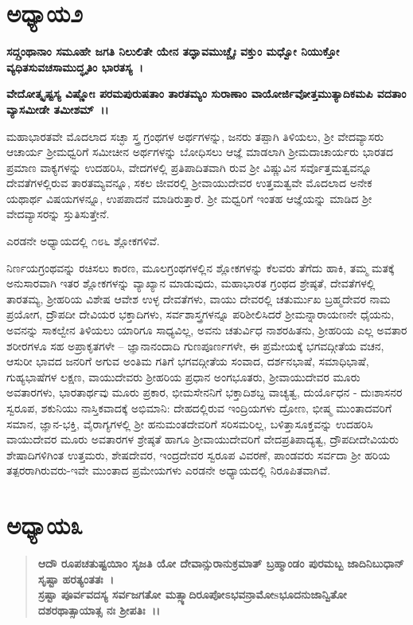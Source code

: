 \section*{ಅಧ್ಯಾಯ\enginline{-}೨}

\textbf{ಸದ್ಗ್ರಂಥಾನಾಂ ಸಮೂಹೇ ಜಗತಿ ನಿಲುಲಿತೇ ಯೇನ ತದ್ಘಾವಮುಚ್ಚೈಃ ವಕ್ತುಂ ಮಧ್ವೋ ನಿಯುಕ್ತೋ ವ್ಯಧಿತಸುವಚಸಾಮುದ್ಧೃತಿಂ ಭಾರತಸ್ಯ~।}

\noindent
\textbf{ವೇದೋತ್ಕೃಷ್ಟಸ್ಯ ವಿಷ್ಣೋಃ ಪರಮಪುರುಷತಾಂ ತಾರತಮ್ಯಂ ಸುರಾಣಾಂ ವಾಯೋರ್ಜಿವೋ\-ತ್ತಮುತ್ಯಾದಿಕಮಪಿ ವದತಾಂ ವ್ಯಾಸಮೀಡೇ ತಮೀಶಮ್~।। }

ಮಹಾಭಾರತವೇ ಮೊದಲಾದ ಸಚ್ಛಾ ಸ್ತ್ರ ಗ್ರಂಥಗಳ ಅರ್ಥಗಳನ್ನು, ಜನರು ತಪ್ಪಾಗಿ ತಿಳಿಯಲು, ಶ‍್ರೀ ವೇದವ್ಯಾಸರು ಆಚಾರ್ಯ ಶ‍್ರೀಮಧ್ವರಿಗೆ ಸಮೀಚೀನ ಅರ್ಥಗಳನ್ನು ಬೋಧಿಸಲು ಆಜ್ಞೆ ಮಾಡಲಾಗಿ ಶ‍್ರೀಮದಾಚಾರ್ಯರು ಭಾರತದ ಪ್ರಮಾಣ ವಾಕ್ಯಗಳನ್ನು ಉದಹರಿಸಿ, ವೇದಗಳಲ್ಲಿ ಪ್ರತಿಪಾದಿತವಾಗಿ ರುವ ಶ‍್ರೀ ವಿಷ್ಣುವಿನ ಸರ್ವೊತ್ತಮತ್ವವನ್ನೂ ದೇವತೆಗಳಲ್ಲಿರುವ ತಾರತಮ್ಯವನ್ನೂ, ಸಕಲ ಜೀವರಲ್ಲಿ ಶ‍್ರೀವಾಯುದೇವರ ಉತ್ತಮತ್ವವೇ ಮೊದಲಾದ ಅನೇಕ ಯಥಾರ್ಥ ವಿಷಯಗಳನ್ನೂ, ಉಪಪಾದನೆ ಮಾಡಿರುತ್ತಾರೆ. ಶ‍್ರೀ ಮಧ್ವರಿಗೆ ಇಂತಹ ಆಜ್ಞೆಯನ್ನು ಮಾಡಿದ ಶ‍್ರೀ ವೇದವ್ಯಾಸರನ್ನು ಸ್ತುತಿಸುತ್ತೇನೆ.

ಎರಡನೇ ಅಧ್ಯಾಯದಲ್ಲಿ ೧೮೬ ಶ್ಲೋಕಗಳಿವೆ.

ನಿರ್ಣಯಗ್ರಂಥವನ್ನು ರಚಿಸಲು ಕಾರಣ, ಮೂಲಗ್ರಂಥಗಳಲ್ಲಿನ ಶ್ಲೋಕಗಳನ್ನು ಕೆಲವರು ತೆಗೆದು ಹಾಕಿ, ತಮ್ಮ ಮತಕ್ಕೆ ಅನುಸಾರವಾಗಿ ಇತರ ಶ್ಲೋಕಗಳನ್ನು ವ್ಯಾಖ್ಯಾನ ಮಾಡುವುದು, ಮಹಾಭಾರತ ಗ್ರಂಥದ ಶ್ರೇಷ್ಠತೆ, ದೇವತೆಗಳಲ್ಲಿ ತಾರತಮ್ಯ, ಶ‍್ರೀಹರಿಯ ವಿಶೇಷ ಆವೇಶ ಉಳ್ಳ ದೇವತೆಗಳು, ವಾಯು ದೇವರಲ್ಲಿ ಚತುರ್ಮುಖ ಬ್ರಹ್ಮದೇವರ ನಾಮ ಪ್ರಯೋಗ, ದ್ರೌಪದೀ ದೇವಿಯರ ಭಕ್ತಾದಿಗಳು, ಸರ್ವಶಾಸ್ತ್ರಗಳನ್ನೂ ಪರಿಶೀಲಿಸಿದರೆ ಶ‍್ರೀಮನ್ನಾರಾಯಣನೇ ಧೈಯನು, ಅವನನ್ನು ಸಾಕಲ್ವೇನ ತಿಳಿಯಲು ಯಾರಿಗೂ ಸಾಧ್ಯವಿಲ್ಲ, ಅವನು ಚತುರ್ವಿಧ ನಾಶರಹಿತನು, ಶ‍್ರೀಹರಿಯ ಎಲ್ಲ ಅವತಾರ ಶರೀರಗಳೂ ಸಹ ಅಪ್ರಾಕೃತಗಳೇ – ಜ್ಞಾನಾನಂದಾದಿ ಗುಣಪೂರ್ಣಗಳೇ, ಈ ಪ್ರಮೇಯಕ್ಕೆ ಭಗವದ್ಗೀತೆಯ ವಚನ, ಆಸುರೀ ಭಾವದ ಜನರಿಗೆ ಅಗುವ ಅಂತಿಮ ಗತಿಗೆ ಭಗವದ್ಗೀತೆಯ ಸಂವಾದ, ದರ್ಶನಭಾಷೆ, ಸಮಾಧಿಭಾಷೆ, ಗುಹ್ಯಭಾಷೆಗಳ ಲಕ್ಷಣ, ವಾಯುದೇವರು ಶ‍್ರೀಹರಿಯ ಪ್ರಧಾನ ಅಂಗಭೂತರು, ಶ‍್ರೀವಾಯುದೇವರ ಮೂರು ಅವತಾರಗಳು, ಭಾರತಾರ್ಥವು ಮೂರು ಪ್ರಕಾರ, ಭೀಮಸೇನನಿಗೆ ಭಕ್ತಾದಿಶಬ್ದ ವಾಚ್ಯತ್ವ, ದುರ್ಯೊಧನ - ದುಃಶಾಸನರ ಸ್ವರೂಪ, ಶಕುನಿಯು ನಾಸ್ತಿಕವಾದಕ್ಕೆ ಅಭಿಮಾನಿ: ದೇಹದಲ್ಲಿರುವ ಇಂದ್ರಿಯಗಳು ದ್ರೋಣ, ಭೀಷ್ಮ ಮುಂತಾದವರಿಗೆ ಸಮಾನ, ಜ್ಞಾನ-ಭಕ್ತಿ, ವೈರಾಗ್ಯಗಳಲ್ಲಿ ಶ‍್ರೀ ಹನುಮಂತದೇವರಿಗೆ ಸರಿಸಮರಿಲ್ಲ, ಬಳಿತ್ತಾಸೂಕ್ತವನ್ನು ಉದಹರಿಸಿ ವಾಯುದೇವರ ಮೂರು ಅವತಾರಗಳ ಶ್ರೇಷ್ಠತೆ ಹಾಗೂ ಶ‍್ರೀವಾಯುದೇವರಿಗೆ ವೇದಪ್ರತಿಪಾದ್ಯತ್ವ, ದ್ರೌಪದೀದೇವಿಯರು ಶೇಷಾದಿಗಳಿಗಿಂತ ಉತ್ತಮರು, ಶೇಷದೇವರ, ಇಂದ್ರದೇವರ ಸ್ವರೂಪ ವಿವರಣೆ, ಪಾಂಡವರು ಸರ್ವದಾ ಶ‍್ರೀ ಹರಿಯ ತತ್ಪರರಾಗಿರುವರು-ಇವೇ ಮುಂತಾದ ಪ್ರಮೇಯಗಳು ಎರಡನೇ ಅಧ್ಯಾಯದಲ್ಲಿ ನಿರೂಪಿತವಾಗಿವೆ.


\section*{ಅಧ್ಯಾಯ\enginline{-}೩}

\begin{verse}
\textbf{ಆದೌ ರೂಪಚತುಷ್ಟಯಿಾಂ ಸೃಜತಿ ಯೋ ದೇವಾನ್ಸುರಾನುಕ್ರಮಾತ್ ಬ್ರಹ್ಮಾಂಡಂ ಪುರಮಬ್ಬ ಜಾದಿನಿಬುಧಾನ್ ಸೃಷ್ಟಾ ಹರತ್ಯಂತತಃ~।}\\\textbf{ ಸ್ರಷ್ಟಾ ಪೂರ್ವವದಸ್ಯ ಸರ್ವಜಗತೋ ಮತ್ಸ್ಯಾದಿರೂಪೋಽಭವನ್\break ರಾಮೋsಭೂದನುಜಾನ್ವಿತೋ ದಶರಥಾತ್ಸಾಯಾತ್ಸ ನಃ ಶ‍್ರೀಪತಿಃ~।।}
\end{verse}

